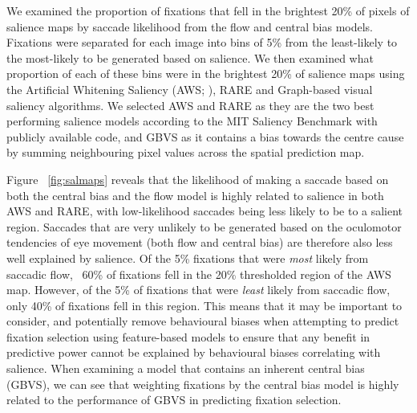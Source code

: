 \documentclass[a4paper, twocolumn, oneside, 10pt]{article}
\begin{document}
We examined the proportion of fixations that fell in the brightest 20\% of pixels of salience maps by saccade likelihood from the flow and central bias models. Fixations were separated for each image into bins of 5\% from the least-likely to the most-likely to be generated based on salience. We then examined what proportion of each of these bins were in the brightest 20\% of salience maps using the Artificial Whitening Saliency (AWS; \cite{garciadiaz2012}), RARE \citep{riche2013} and Graph-based visual saliency \citep[GBVS;][]{harel2006} algorithms. We selected AWS and RARE as they are the two best performing salience models according to the MIT Saliency Benchmark \citep{mit-saliency-benchmark,judd2012} with publicly available code, and GBVS as it contains a bias towards the centre cause by summing neighbouring pixel values across the spatial prediction map.

Figure ~\ref{fig:salmaps} reveals that the likelihood of making a saccade based on both the central bias and the flow model is highly related to salience in both AWS and RARE, with low-likelihood saccades being less likely to be to a salient region. Saccades that are very unlikely to be generated based on the oculomotor tendencies of eye movement (both flow and central bias) are therefore also less well explained by salience. Of the 5\% fixations that were \textit{most} likely from saccadic flow, ~60\% of fixations fell in the 20\% thresholded region of the AWS map. However, of the 5\% of fixations that were \textit{least} likely from saccadic flow, only 40\% of fixations fell in this region. This means that it may be important to consider, and potentially remove behavioural biases when attempting to predict fixation selection using feature-based models to ensure that any benefit in predictive power cannot be explained by behavioural biases correlating with salience. When examining a model that contains an inherent central bias (GBVS), we can see that weighting fixations by the \citet{clarke-tatler2014} central bias model is highly related to the performance of GBVS in predicting fixation selection.

\end{document}
